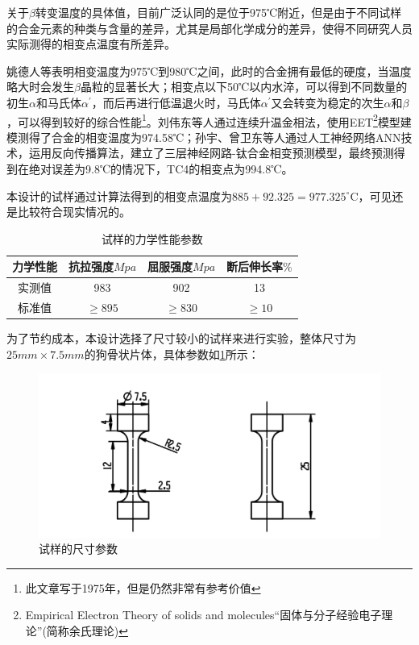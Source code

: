 关于$\beta$转变温度的具体值，目前广泛认同的是位于975℃附近，但是由于不同试样的合金元素的种类与含量的差异，尤其是局部化学成分的差异，使得不同研究人员实际测得的相变点温度有所差异\cite{wangtaoTC4hejinxiangbianwendujiancezhongjieguobuyizhiyuanyinfenxi2013}。

姚德人等\cite{yaoderenTc4taihejinxiangbiandiandeceding1975}表明相变温度为975℃到980℃之间，此时的合金拥有最低的硬度，当温度略大时会发生$\beta$晶粒的显著长大；相变点以下50℃以内水淬，可以得到不同数量的初生$ \alpha $和马氏体$ \alpha^{\prime} $，而后再进行低温退火时，马氏体$ \alpha^{\prime} $又会转变为稳定的次生$ \alpha$和$ \beta $，可以得到较好的综合性能\footnote{\color{red}此文章写于1975年，但是仍然非常有参考价值}。刘伟东等人\cite{liuweidongTC4hejinVzhuanbianwendudejinxiangfacedingyulilunjisuan2014}通过连续升温金相法，使用EET\footnote{Empirical Electron Theory of solids and molecules“固体与分子经验电子理论”(简称余氏理论)}模型建模测得了\ti 合金的相变温度为974.58℃；孙宇、曾卫东等人\cite{sunyuYingyongrengongshenjingwangluoyanjiuhuaxueyuansuduitaihejinxiangbiandiandeyingxiang2010}通过人工神经网络ANN技术，运用反向传播算法，建立了三层神经网路-钛合金相变预测模型，最终预测得到在绝对误差为9.8℃的情况下，TC4的相变点为994.8℃。

本设计的试样通过计算法得到的相变点温度为$ 885+92.325=977.325^{\circ} \mathrm{C} $，可见还是比较符合现实情况的。
\begin{table}[htbp]
	\centering
	\caption{试样的力学性能参数}
	\label{sec:mytc4machin}
	\begin{tabular}{cccc}
		\toprule
		力学性能& 抗拉强度$Mpa  $& 屈服强度$ Mpa $&断后伸长率$ \% $\\ \midrule
		实测值 & 983 &902 & 13\\
		标准值 &$ \ge 895 $&$ \ge 830 $&$ \ge 10 $ \\ \bottomrule
	\end{tabular}
\end{table}


为了节约成本，本设计选择了尺寸较小的试样来进行实验，整体尺寸为$ 25mm\times 7.5mm $的狗骨状片体，具体参数如\ref{fig:试样尺寸}所示：

\begin{figure}[h!]
	\centering
	\includegraphics[width=0.99\linewidth]{pic/试样}
	\caption{试样的尺寸参数}
	\label{fig:试样尺寸}
\end{figure}


